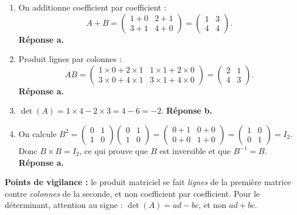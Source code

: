 \documentclass[11pt]{article}
\begin{document}
\begin{corrige}
\begin{enumerate}
\item On additionne coefficient par coefficient :
\[ A+B=\begin{pmatrix} 1+0 & 2+1 \\ 3+1 & 4+0 \end{pmatrix}=\begin{pmatrix} 1 & 3 \\ 4 & 4 \end{pmatrix}. \]
\textbf{Réponse a.}

\item Produit lignes par colonnes :
\[ AB=\begin{pmatrix} 1\times0+2\times1 & 1\times1+2\times0 \\ 3\times0+4\times1 & 3\times1+4\times0 \end{pmatrix}=\begin{pmatrix} 2 & 1 \\ 4 & 3 \end{pmatrix}. \]
\textbf{Réponse a.}

\item $\det(A)=1\times4-2\times3=4-6=-2$. \textbf{Réponse b.}

\item On calcule $B^2=\begin{pmatrix} 0 & 1 \\ 1 & 0 \end{pmatrix}\begin{pmatrix} 0 & 1 \\ 1 & 0 \end{pmatrix}=\begin{pmatrix} 0+1 & 0+0 \\ 0+0 & 1+0 \end{pmatrix}=\begin{pmatrix} 1 & 0 \\ 0 & 1 \end{pmatrix}=I_2$. Donc $B\times B=I_2$, ce qui prouve que $B$ est inversible et que $B^{-1}=B$. \textbf{Réponse a.}
\end{enumerate}
\textbf{Points de vigilance :} le produit matriciel se fait \emph{lignes} de la première matrice contre \emph{colonnes} de la seconde, et non coefficient par coefficient. Pour le déterminant, attention au signe : $\det(A)=ad-bc$, et non $ad+bc$.
\end{corrige}
\end{document}
